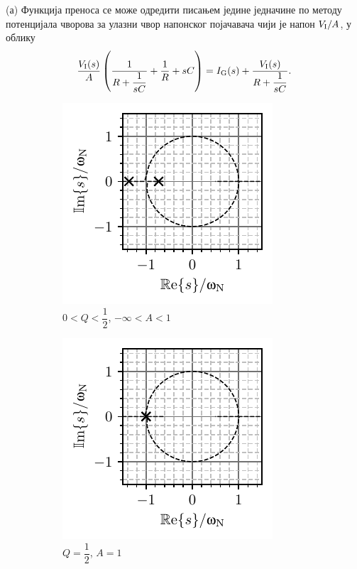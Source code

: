 (а) Функција преноса се може одредити писањем једине једначине по методу потенцијала чворова за улазни чвор напонског
појачавача чији је напон $V_{\rm I}/A$, у облику 
\begin{equation}
    \dfrac{V_{\rm I}(s)}{A}
    \left(
        \dfrac{1}{R + \dfrac{1}{sC}}
        + 
        \dfrac{1}{R}
        +
        sC
    \right)
    = 
    I_{\rm G}(s)
    + 
    \dfrac{V_{\rm I}(s)}{R + \dfrac{1}{sC}}.
\end{equation}
%
\begin{figure}[b!]
    \centering
    \begin{subfigure}[t]{0.32\textwidth}
        \centering
        \includegraphics{fig/Q_polovi_1.pdf}
        \caption{$0 < Q < \dfrac{1}{2}$, $-\infty < A < 1$  }
    \end{subfigure}
    \begin{subfigure}[t]{0.32\textwidth}
        \centering
        \includegraphics{fig/Q_polovi_2.pdf}
        \caption{$Q = \dfrac{1}{2}$, $ A = 1$}
    \end{subfigure}
    \begin{subfigure}[t]{0.32\textwidth}

\end{subfigure}
\end{figure}
